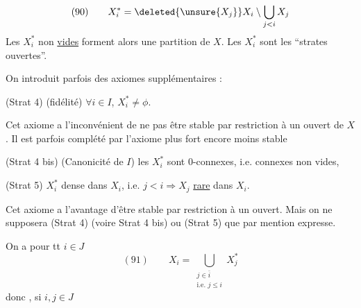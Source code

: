 
\[(90)\qquad X_i^*=\deleted{\unsure{X_j}}X_i\setminus\bigcup_{j<i}X_j\]
Les $X_i^*$ non \uline{vides} forment alors une partition de $X$. Les $X_i^*$ sont les ``strates ouvertes''.

On introduit parfois des axiomes supplémentaires :

(Strat 4) (fidélité) $\forall i\in I$, $X_i^*\neq\phi$.

Cet axiome a l'inconvénient de ne pas être stable par  restriction à un ouvert de $X$. Il est parfois complété par l'axiome plus fort encore moins stable

(Strat 4 bis) (Canonicité de $I$) les $X_i^*$ sont $0$-connexes, i.e. connexes non vides,

(Strat 5)  $X_i^*$ dense dans $X_i$,  i.e. $j<i\Rightarrow X_j$ \uline{rare} dans $X_i$.

Cet axiome a l'avantage d'être stable par restriction à un ouvert. Mais on ne supposera (Strat 4) (voire Strat 4 bis) ou (Strat 5) que par mention expresse.

On a pour tt $i\in J$
\[
(91)\qquad X_i=\bigcup_{\substack{j\in\bar i\\\text{i.e. }j\leq i}}X_j^*
\]
donc , si $i,j\in J$
